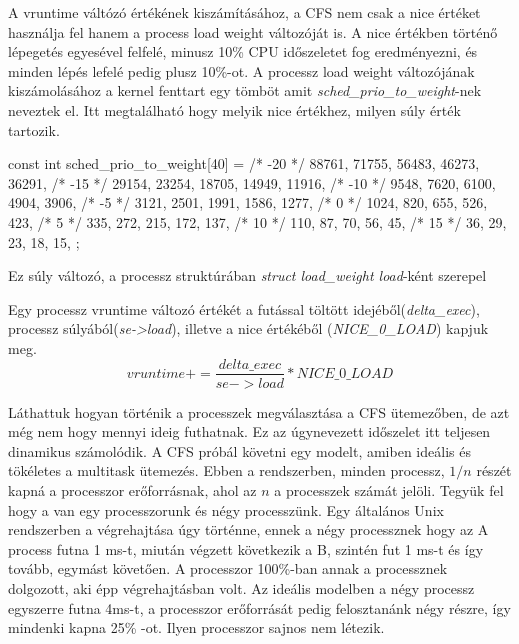 A vruntime váltózó értékének kiszámításához, a CFS nem csak a nice értéket használja fel hanem a process load weight változóját is. A nice értékben történő lépegetés egyesével felfelé, minusz 10\% CPU időszeletet fog eredményezni, és minden lépés lefelé pedig plusz 10\%-ot. 
A processz load weight változójának kiszámolásához a kernel fenttart egy tömböt amit \textit{sched\_prio\_to\_weight}-nek neveztek el. Itt megtalálható hogy melyik nice értékhez, milyen súly érték tartozik.
\begin{cpp}
const int sched_prio_to_weight[40] = {
 /* -20 */     88761,     71755,     56483,     46273,     36291,
 /* -15 */     29154,     23254,     18705,     14949,     11916,
 /* -10 */      9548,      7620,      6100,      4904,      3906,
 /*  -5 */      3121,      2501,      1991,      1586,      1277,
 /*   0 */      1024,       820,       655,       526,       423,
 /*   5 */       335,       272,       215,       172,       137,
 /*  10 */       110,        87,        70,        56,        45,
 /*  15 */        36,        29,        23,        18,        15,
};
\end{cpp}

\noindent Ez súly változó, a processz struktúrában \textit{struct load\_weight load}-ként szerepel

Egy processz vruntime változó értékét a futással töltött idejéből(\textit{delta\_exec}), processz súlyából(\textit{se->load}), illetve a nice értékéből (\textit{NICE\_0\_LOAD}) kapjuk meg.
\begin{equation} \label{eq:2}
vruntime += \frac{delta\_exec}{se->load}*NICE\_0\_LOAD
\end{equation}

Láthattuk hogyan történik a processzek megválasztása a CFS ütemezőben, de azt még nem hogy mennyi ideig futhatnak.
Ez az úgynevezett időszelet itt teljesen dinamikus számolódik.
A CFS próbál követni egy modelt, amiben ideális és tökéletes a multitask ütemezés. Ebben a rendszerben, minden processz, $1/n$ részét kapná a processzor erőforrásnak, ahol az $n$ a processzek számát jelöli. 
Tegyük fel hogy a van egy processzorunk és négy processzünk.
Egy általános Unix rendszerben a végrehajtása úgy történne, ennek a négy processznek hogy az A process futna 1 ms-t, miután végzett következik a B, szintén fut 1 ms-t és így tovább, egymást követően. A processzor 100\%-ban annak a processznek dolgozott, aki épp végrehajtásban volt.
Az ideális modelben a négy processz egyszerre futna 4ms-t, a processzor erőforrását pedig felosztanánk négy részre, így mindenki kapna 25\% -ot. Ilyen processzor sajnos nem létezik.

